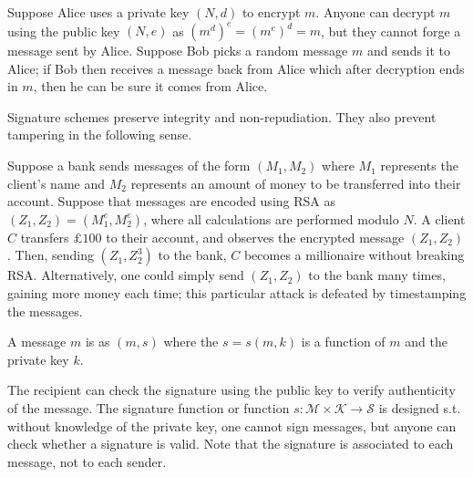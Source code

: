 \begin{example}
    Suppose Alice uses a private key $(N, d)$ to encrypt $m$.
    Anyone can decrypt $m$ using the public key $(N, e)$ as $(m^d)^e = (m^e)^d = m$, but they cannot forge a message sent by Alice.
    Suppose Bob picks a random message $m$ and sends it to Alice; if Bob then receives a message back from Alice which after decryption ends in $m$, then he can be sure it comes from Alice.
\end{example}

Signature schemes preserve integrity and non-repudiation.
They also prevent tampering in the following sense.

\begin{example}
    Suppose a bank sends messages of the form $(M_1, M_2)$ where $M_1$ represents the client's name and $M_2$ represents an amount of money to be transferred into their account.
    Suppose that messages are encoded using RSA as $(Z_1, Z_2) = (M_1^e, M_2^e)$, where all calculations are performed modulo $N$.
    A client $C$ transfers $\pounds 100$ to their account, and observes the encrypted message $(Z_1, Z_2)$.
    Then, sending $(Z_1, Z_2^3)$ to the bank, $C$ becomes a millionaire without breaking RSA.
    Alternatively, one could simply send $(Z_1, Z_2)$ to the bank many times, gaining more money each time; this particular attack is defeated by timestamping the messages.
\end{example}

\begin{definition}[Signed]
    A message $m$ is  as $(m, s)$ where the  $s = s(m,k)$ is a function of $m$ and the private key $k$.
\end{definition}

The recipient can check the signature using the public key to verify authenticity of the message.
The signature function or  function $s \colon \mathcal M \times \mathcal K \to \mathcal S$ is designed s.t. without knowledge of the private key, one cannot sign messages, but anyone can check whether a signature is valid.
Note that the signature is associated to each message, not to each sender.

